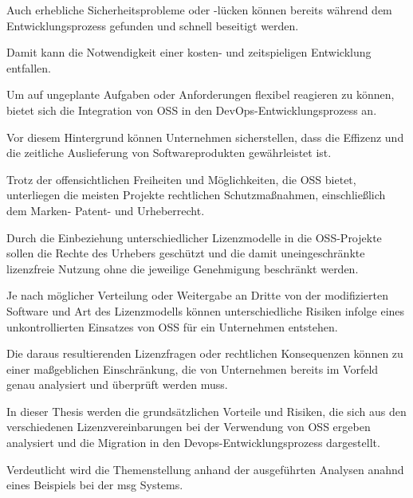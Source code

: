 Auch erhebliche Sicherheitsprobleme oder -lücken können bereits während dem Entwicklungsprozess gefunden und schnell beseitigt werden.

Damit kann die Notwendigkeit einer kosten- und zeitspieligen Entwicklung entfallen. 

Um auf ungeplante Aufgaben oder Anforderungen flexibel reagieren zu können, bietet sich die Integration von OSS in den DevOps-Entwicklungsprozess an.    

Vor diesem Hintergrund können Unternehmen sicherstellen, dass die Effizenz und die zeitliche Auslieferung von Softwareprodukten gewährleistet ist. 

Trotz der offensichtlichen Freiheiten und Möglichkeiten, die OSS bietet, unterliegen die meisten Projekte rechtlichen Schutzmaßnahmen, einschließlich dem Marken- Patent- und Urheberrecht.

Durch die Einbeziehung unterschiedlicher Lizenzmodelle in die OSS-Projekte sollen die Rechte des Urhebers geschützt und die damit uneingeschränkte lizenzfreie Nutzung ohne die jeweilige Genehmigung beschränkt werden. 

Je nach möglicher Verteilung oder Weitergabe an Dritte von der modifizierten Software und Art des Lizenzmodells können unterschiedliche Risiken infolge eines unkontrollierten Einsatzes von OSS für ein Unternehmen entstehen.

Die daraus resultierenden Lizenzfragen oder rechtlichen Konsequenzen können zu einer maßgeblichen Einschränkung, die von Unternehmen bereits im Vorfeld genau analysiert und überprüft werden muss.  

In dieser Thesis werden die grundsätzlichen Vorteile und Risiken, die sich aus den verschiedenen Lizenzvereinbarungen bei der Verwendung von OSS ergeben analysiert und die Migration in den Devops-Entwicklungsprozess dargestellt.

Verdeutlicht wird die Themenstellung anhand der ausgeführten Analysen anahnd eines Beispiels bei der msg Systems.

